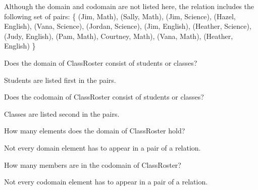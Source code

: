 \documentclass{ximera}
\begin{document}
  
  \begin{definition}
  Although the domain and codomain are not listed here, the  relation includes the following set of pairs:
\{ (Jim, Math), (Sally, Math), (Jim, Science), (Hazel, English), (Vana, Science), (Jordan, Science), (Jim, English), (Heather, Science), (Judy, English), (Pam, Math), Courtney, Math), (Vana, Math), (Heather, English)    \}
  
  \end{definition}
  




\begin{exercise}
Does the domain of ClassRoster consist of students or classes?

  \begin{multipleChoice}
  \end{multipleChoice}
  \begin{feedback}
Students are listed first in the pairs.
  \end{feedback}
\end{exercise}



\begin{exercise}
Does the codomain of ClassRoster consist of students or classes?

  \begin{multipleChoice}
  \end{multipleChoice}
  \begin{feedback}
Classes are listed second in the pairs.
  \end{feedback}
\end{exercise}





\begin{exercise}
How many elements does the domain of ClassRoster hold?
  \begin{multipleChoice}
  \end{multipleChoice}
  \begin{feedback}
Not every domain element has to appear in a pair of a relation.
  \end{feedback}
\end{exercise}




\begin{exercise}
How many members are in the codomain of ClassRoster?
  \begin{multipleChoice}
  \end{multipleChoice}
  \begin{feedback}
Not every codomain element has to appear in a pair of a relation.
  \end{feedback}
\end{exercise}
\end{document}
